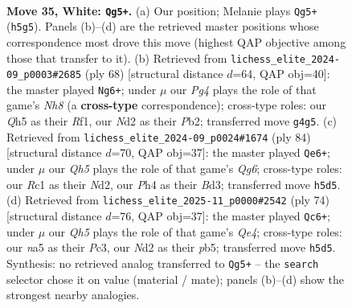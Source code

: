 \documentclass[11pt]{article}
\begin{document}
\clearpage

\begin{figure}[p]\centering
\begin{subfigure}{0.46\textwidth}\centering
\resizebox{\linewidth}{!}{%
\newchessgame
\chessboard[
  setfen={r6r/p3k1pp/3b4/n2p3Q/p2P2PP/4P2K/1q1N4/2R5 w - - 2 35},
  showmover=false,
  pgfstyle=straightmove, color=movearrow, markmove={h5-g5}
]}
\caption{}
\end{subfigure}\hfill
\begin{subfigure}{0.46\textwidth}\centering
\resizebox{\linewidth}{!}{%
\newchessgame
\chessboard[
  setfen={3r1kbN/1p4p1/3r1p2/q7/p6Q/P1N4P/1P4P1/5R1K w - - 6 35},
  showmover=false,
  pgfstyle=straightmove, color=movearrow, markmove={h8-g6}
]}
\caption{}
\end{subfigure}
\\[4pt]
\begin{subfigure}{0.46\textwidth}\centering
\resizebox{\linewidth}{!}{%
\newchessgame
\chessboard[
  setfen={1b3rk1/6p1/2p3Qp/2P5/p7/3B2P1/3N1PPK/2q5 w - - 18 43},
  showmover=false,
  pgfstyle=straightmove, color=movearrow, markmove={g6-e6}
]}
\caption{}
\end{subfigure}\hfill
\begin{subfigure}{0.46\textwidth}\centering
\resizebox{\linewidth}{!}{%
\newchessgame
\chessboard[
  setfen={1r2kr2/8/p3pq2/1p6/2p1Q1P1/2P2P2/PP4K1/7R w - - 0 38},
  showmover=false,
  pgfstyle=straightmove, color=movearrow, markmove={e4-c6}
]}
\caption{}
\end{subfigure}
\caption{\textbf{Move 35, White: \texttt{Qg5+}.} (a) Our position; Melanie plays \texttt{Qg5+} (\texttt{h5g5}). Panels (b)--(d) are the retrieved master positions whose correspondence most drove this move (highest QAP objective among those that transfer to it). (b) Retrieved from \texttt{lichess\_elite\_2024-09\_p0003\#2685} (ply 68) [structural distance $d$=64, QAP obj=40]: the master played \texttt{Ng6+}; under $\mu$ our \emph{Pg4} plays the role of that game's \emph{Nh8} (a \textbf{cross-type} correspondence); cross-type roles: our \emph{Q}h5 as their \emph{R}f1, our \emph{N}d2 as their \emph{P}b2; transferred move \texttt{g4g5}. (c) Retrieved from \texttt{lichess\_elite\_2024-09\_p0024\#1674} (ply 84) [structural distance $d$=70, QAP obj=37]: the master played \texttt{Qe6+}; under $\mu$ our \emph{Qh5} plays the role of that game's \emph{Qg6}; cross-type roles: our \emph{R}c1 as their \emph{N}d2, our \emph{P}h4 as their \emph{B}d3; transferred move \texttt{h5d5}. (d) Retrieved from \texttt{lichess\_elite\_2025-11\_p0000\#2542} (ply 74) [structural distance $d$=76, QAP obj=37]: the master played \texttt{Qc6+}; under $\mu$ our \emph{Qh5} plays the role of that game's \emph{Qe4}; cross-type roles: our \emph{n}a5 as their \emph{P}c3, our \emph{N}d2 as their \emph{p}b5; transferred move \texttt{h5d5}. Synthesis: no retrieved analog transferred to \texttt{Qg5+} -- the \texttt{search} selector chose it on value (material / mate); panels (b)--(d) show the strongest nearby analogies.}
\label{fig:thought-m68}
\end{figure}
\end{document}
